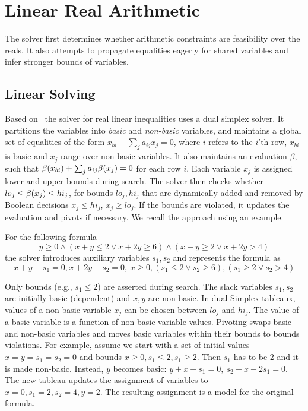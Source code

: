 \section{Linear Real Arithmetic}
\label{sec:lp}
The solver first determines whether arithmetic constraints are feasibility over the reals.
It also attempts to propagate equalities eagerly for shared variables and infer stronger bounds of variables.

\subsection{Linear Solving}

Based on~\cite{DutertreM06} the solver for real linear inequalities uses a dual simplex solver.
It partitions the variables into \emph{basic} and \emph{non-basic} variables, and maintains
a global set of equalities of the form $x_{bi} + \sum_j a_{ij}x_j = 0$,
where $i$ refers to the $i$'th row, $x_{bi}$ is basic and $x_j$ range over non-basic variables.
It also maintains an evaluation
$\beta$, such that $\beta(x_{bi}) + \sum_j a_{ij}\beta(x_j)= 0$ for each row $i$.
Each variable $x_j$ is assigned lower and upper bounds during search.
The solver then checks whether $lo_j \leq \beta(x_j) \leq hi_j$, for bounds
$lo_j, hi_j$ that are dynamically added and removed by Boolean decisions $x_j \leq hi_j$, $x_j \geq lo_j$.
If the bounds are violated, it updates the evaluation and pivots if necessary.
We recall the approach using an example.

\begin{example}

For the following formula
\[
 y \geq 0 \land (x + y \leq 2 \lor x + 2y \geq 6) \land (x + y \geq 2 \lor x + 2y > 4)
\]
the solver introduces auxiliary variables $s_1, s_2$ and represents the formula as
\[
  x + y - s_1 = 0, x + 2y - s_2 = 0, \
  x \geq 0, (s_1 \leq 2 \vee s_2 \geq 6), (s_1 \geq 2 \vee s_2 > 4)
\]

Only bounds (e.g., $s_1 \leq 2$) are asserted during search.
The slack variables $s_1, s_2$ are initially basic (dependent) and $x, y$ are non-basic.
In dual Simplex tableaux, values of a non-basic variable
$x_j$ can be chosen between $lo_j$ and $hi_j$.
The value of a basic variable is a function of non-basic variable values.
Pivoting swaps basic and non-basic variables and moves basic variables within their bounds to bounds violations.
For example, assume we start with a set of initial values
$x = y = s_1 = s_2 = 0$
and bounds $x \geq 0, s_1 \leq 2, s_1 \geq 2$. 
Then $s_1$ has to be 2 and it is made non-basic. 
Instead, $y$ becomes basic:
$
{y} + x - s_1 = 0, \ {s_2} + x - 2s_1 = 0.
$
The new tableau updates the assignment of variables to
$x = 0, s_1 = 2, s_2 = 4, y = 2$. The resulting assignment
is a model for the original formula.

\end{example}

